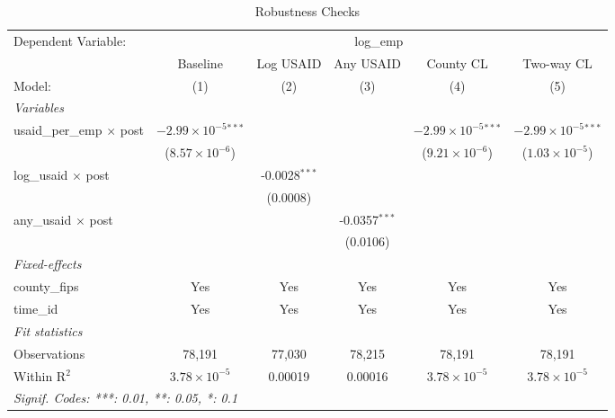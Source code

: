 
\begin{table}[htbp]
   \caption{\label{tab:robustness} Robustness Checks}
   \centering
   \begin{adjustbox}{max width=\textwidth}
   \begin{tabular}{lccccc}
      \tabularnewline \midrule \midrule
      Dependent Variable: & \multicolumn{5}{c}{log\_emp}\\
                                       & Baseline                       & Log USAID       & Any USAID       & County CL                      & Two-way CL \\   
      Model:                           & (1)                            & (2)             & (3)             & (4)                            & (5)\\  
      \midrule
      \emph{Variables}\\
      usaid\_per\_emp $\times$ post    & $-2.99\times 10^{-5}$$^{***}$  &                 &                 & $-2.99\times 10^{-5}$$^{***}$  & $-2.99\times 10^{-5}$$^{***}$\\    
                                       & ($8.57\times 10^{-6}$)         &                 &                 & ($9.21\times 10^{-6}$)         & ($1.03\times 10^{-5}$)\\    
      log\_usaid $\times$ post         &                                & -0.0028$^{***}$ &                 &                                &   \\   
                                       &                                & (0.0008)        &                 &                                &   \\   
      any\_usaid $\times$ post         &                                &                 & -0.0357$^{***}$ &                                &   \\   
                                       &                                &                 & (0.0106)        &                                &   \\   
      \midrule
      \emph{Fixed-effects}\\
      county\_fips                     & Yes                            & Yes             & Yes             & Yes                            & Yes\\  
      time\_id                         & Yes                            & Yes             & Yes             & Yes                            & Yes\\  
      \midrule
      \emph{Fit statistics}\\
      Observations                     & 78,191                         & 77,030          & 78,215          & 78,191                         & 78,191\\  
      Within R$^2$                     & $3.78\times 10^{-5}$           & 0.00019         & 0.00016         & $3.78\times 10^{-5}$           & $3.78\times 10^{-5}$\\   
      \midrule \midrule
      \multicolumn{6}{l}{\emph{Signif. Codes: ***: 0.01, **: 0.05, *: 0.1}}\\
   \end{tabular}
   \end{adjustbox}


\end{table}
